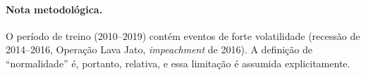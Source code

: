 \paragraph{Nota metodológica.} O período de treino (2010--2019) contém eventos de forte
volatilidade (recessão de 2014--2016, Operação Lava Jato, \emph{impeachment} de 2016).
A definição de ``normalidade'' é, portanto, relativa, e essa limitação é assumida
explicitamente.
